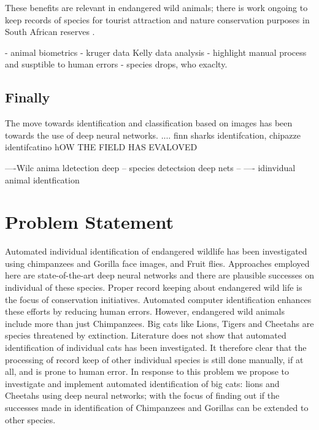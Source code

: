 These benefits are relevant in endangered wild animals; there is work ongoing to keep records of species for tourist attraction and nature conservation purposes in South African reserves \cite{marnewick2008evaluating}.

- animal biometrics
- kruger data Kelly data analysis
- highlight manual process and susptible to human errors 
- species drops, who exaclty. 

\subsection{Finally}
The move towards identification and classification based on images has been towards the use of deep neural networks.  \cite{hughes2017automated}  .... finn sharks identifcation,
chipazze identifcatino \cite{loos2013automated}
hOW THE FIELD HAS EVALOVED \cite{weinstein2018computer}

----Wilc anima ldetection  deep  \cite{verma2018wild}
-- species detectsion deep nets -- 
---- idinvidual animal identfication \cite{schneider2019similarity}

\section{Problem Statement}
Automated individual identification of endangered wildlife has been investigated using chimpanzees and Gorilla face images, and Fruit flies. Approaches employed here are state-of-the-art deep neural networks and there are plausible successes on individual of these species. Proper record keeping about endangered wild life is the focus of conservation initiatives. Automated computer identification enhances these efforts by reducing human errors.      
However, endangered wild animals include more than just Chimpanzees. Big cats like Lions, Tigers and Cheetahs are species threatened by extinction. Literature does not show that automated identification of individual cats has been investigated. It therefore clear that the processing of record keep of other individual species is still done manually, if at all, and is prone to human error.        
In response to this problem we  propose to investigate and implement automated identification of big cats: lions and Cheetahs using deep neural networks; with the focus of finding out if the successes made in identification of Chimpanzees and Gorillas can be extended to other species. 


